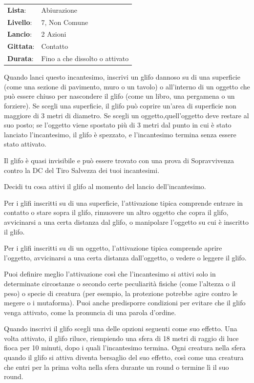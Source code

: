 \begin{multicols}{2}
\noindent\begin{tabularx}{\linewidth}{p{1.3cm}X}
	\rowcolor{gray!20}\textbf{Lista}: & Abiurazione \\
	\textbf{Livello}: & 7, Non Comune \\
	\rowcolor{gray!20}\textbf{Lancio}: & 2 Azioni \\
	\textbf{Gittata}: & Contatto \\
	\rowcolor{gray!20}\textbf{Durata}: & Fino a che dissolto o attivato \\
\end{tabularx}\smallskip

Quando lanci questo incantesimo, inscrivi un glifo dannoso su di una superficie (come una sezione di pavimento, muro o un tavolo) o all'interno di un oggetto che può essere chiuso per nascondere il glifo (come un libro, una pergamena o un forziere). Se scegli una superficie, il glifo può coprire un'area di superficie non maggiore di 3 metri di diametro. Se scegli un oggetto,quell'oggetto deve restare al suo posto; se l'oggetto viene spostato più di 3 metri dal punto in cui è stato lanciato l'incantesimo, il glifo è spezzato, e l'incantesimo termina senza essere stato attivato.

Il glifo è quasi invisibile e può essere trovato con una prova di Sopravvivenza contro la DC del Tiro Salvezza dei tuoi incantesimi.

Decidi tu cosa attivi il glifo al momento del lancio dell'incantesimo.

Per i glifi inscritti su di una superficie, l'attivazione tipica comprende entrare in contatto o stare sopra il glifo, rimuovere un altro oggetto che copra il glifo, avvicinarsi a una certa distanza dal glifo, o manipolare l'oggetto su cui è inscritto il glifo.

Per i glifi inscritti su di un oggetto, l'attivazione tipica comprende aprire l'oggetto, avvicinarsi a una certa distanza dall'oggetto, o vedere o leggere il glifo.

Puoi definire meglio l'attivazione così che l'incantesimo si attivi solo in determinate circostanze o secondo certe peculiarità fisiche (come l'altezza o il peso) o specie di creatura (per esempio, la protezione potrebbe agire contro le megere o i mutaforma). Puoi anche predisporre condizioni per evitare che il glifo venga attivato, come la pronuncia di una parola d'ordine.

Quando inscrivi il glifo scegli una delle opzioni seguenti come suo effetto. Una volta attivato, il glifo riluce, riempiendo una sfera di 18 metri di raggio di luce fioca per 10 minuti, dopo i quali l'incantesimo termina. Ogni creatura nella sfera quando il glifo si attiva diventa bersaglio del suo effetto, così come una creatura che entri per la prima volta nella sfera durante un round o termine lì il suo round.


\end{multicols}
